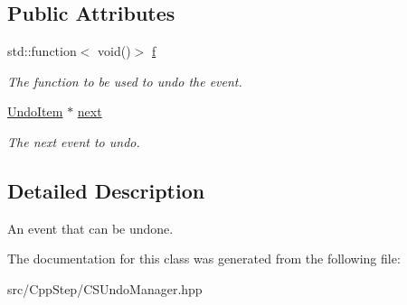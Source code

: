 \subsection*{Public Attributes}
\begin{DoxyCompactItemize}
\item 
\mbox{\label{classCSUndoManager_1_1UndoItem_aca1eebab67a484cdb8fb4d76d38276b0}} 
std\+::function$<$ void()$>$ \hyperlink{classCSUndoManager_1_1UndoItem_aca1eebab67a484cdb8fb4d76d38276b0}{f}
\begin{DoxyCompactList}\small\item\em The function to be used to undo the event. \end{DoxyCompactList}\item 
\mbox{\label{classCSUndoManager_1_1UndoItem_a8619cecf66d3b11ed90e4b1bf91d6026}} 
\hyperlink{classCSUndoManager_1_1UndoItem}{Undo\+Item} $\ast$ \hyperlink{classCSUndoManager_1_1UndoItem_a8619cecf66d3b11ed90e4b1bf91d6026}{next}
\begin{DoxyCompactList}\small\item\em The next event to undo. \end{DoxyCompactList}\end{DoxyCompactItemize}


\subsection{Detailed Description}
An event that can be undone. 

The documentation for this class was generated from the following file\+:\begin{DoxyCompactItemize}
\item 
src/\+Cpp\+Step/C\+S\+Undo\+Manager.\+hpp\end{DoxyCompactItemize}

